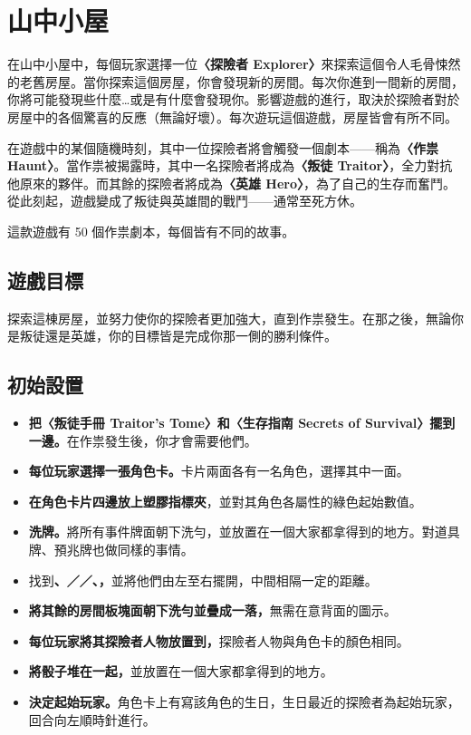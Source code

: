 
\section{山中小屋} \label{sec:intro}

在山中小屋中，每個玩家選擇一位\textbf{〈探險者 Explorer〉}來探索這個令人毛骨悚然的老舊房屋。當你探索這個房屋，你會發現新的房間。每次你進到一間新的房間，你將可能發現些什麼…或是有什麼會發現你。影響遊戲的進行，取決於探險者對於房屋中的各個驚喜的反應（無論好壞）。每次遊玩這個遊戲，房屋皆會有所不同。

在遊戲中的某個隨機時刻，其中一位探險者將會觸發一個劇本——稱為\textbf{〈作祟 Haunt〉}。當作祟被揭露時，其中一名探險者將成為\textbf{〈叛徒 Traitor〉}，全力對抗他原來的夥伴。而其餘的探險者將成為\textbf{〈英雄 Hero〉}，為了自己的生存而奮鬥。從此刻起，遊戲變成了叛徒與英雄間的戰鬥——通常至死方休。

這款遊戲有 50 個作祟劇本，每個皆有不同的故事。


\subsection{遊戲目標}

探索這棟房屋，並努力使你的探險者更加強大，直到作祟發生。在那之後，無論你是叛徒還是英雄，你的目標皆是完成你那一側的勝利條件。


\subsection{初始設置}

\begin{itemize}
  \item \textbf{把〈叛徒手冊 Traitor’s Tome〉和〈生存指南 Secrets of Survival〉擺到一邊。}在作祟發生後，你才會需要他們。
  \item \textbf{每位玩家選擇一張角色卡。}卡片兩面各有一名角色，選擇其中一面。
  \item \textbf{在角色卡片四邊放上塑膠指標夾}，並對其角色各屬性的綠色起始數值。
  \item \textbf{洗牌。}將所有事件牌面朝下洗勻，並放置在一個大家都拿得到的地方。對道具牌、預兆牌也做同樣的事情。
  \item 找到\textbf{、／／、，}並將他們由左至右擺開，中間相隔一定的距離。
  \item \textbf{將其餘的房間板塊面朝下洗勻並疊成一落，}無需在意背面的圖示。
  \item \textbf{每位玩家將其探險者人物放置到，}探險者人物與角色卡的顏色相同。
  \item \textbf{將骰子堆在一起，}並放置在一個大家都拿得到的地方。
  \item \textbf{決定起始玩家。}角色卡上有寫該角色的生日，生日最近的探險者為起始玩家，回合向左順時針進行。
\end{itemize}

